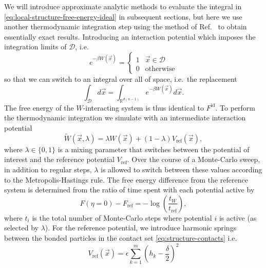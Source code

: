 \documentclass[11pt,twoside]{report}
\begin{document}
We will introduce approximate analytic methods to evaluate the integral in \eqref{eq:local-structure-free-energy-ideal} in subsequent sections, but here we use another thermodynamic integration step using the method of Ref.\ \cite{SchillingJCP2009} to obtain essentially exact results.
Introducing an interaction potential which imposes the integration limits of $\mathcal{D}$, i.e.\
\begin{equation*}
  e^{-\beta W(\vec{x})}
  =
  \begin{cases}
    1 & \vec{x} \in \mathcal{D} \\
    0 & \textrm{otherwise}
  \end{cases}
\end{equation*}
so that we can switch to an integral over all of space, i.e.\ the replacement
\begin{equation*}
  \int_{\mathcal{D}} d\vec{x}
  =
  \int_{\mathbb{R}^{d(n-1)}} e^{-\beta W(\vec{x})} d\vec{x}.
\end{equation*}
The free energy of the $W$-interacting system is thus identical to $F^\mathrm{id}$.
To perform the thermodynamic integration we simulate with an intermediate interaction potential \cite{SchillingJCP2009}
\begin{equation*}
  \widetilde{W}(\vec{x}, \lambda)
  =
  \lambda W(\vec{x}) + (1-\lambda) V_\mathrm{ref}(\vec{x}),
\end{equation*}
where $\lambda \in \{0,1\}$ is a mixing parameter that switches between the potential of interest and the reference potential $V_\mathrm{ref}$.
Over the course of a Monte-Carlo sweep, in addition to regular steps, $\lambda$ is allowed to switch between these values according to the Metropolis-Hastings rule.
The free energy difference from the reference system is determined from the ratio of time spent with each potential active by
\begin{equation}\label{eq:ideal-free-energy-change}
  F(\eta = 0) - F_\mathrm{ref}
  = -\log{\left( \frac{t_W}{t_\mathrm{ref}} \right)},
\end{equation}
where $t_i$ is the total number of Monte-Carlo steps where potential $i$ is active (as selected by $\lambda$).
For the reference potential, we introduce harmonic springs between the bonded particles in the contact set \eqref{eq:structure-contacts} i.e.\
\begin{equation*}
  V_\mathrm{ref}(\vec{x})
  =
  \epsilon \sum_{k=1}^m \left( h_k - \frac{\delta}{2} \right)^2
\end{equation*}
\end{document}
